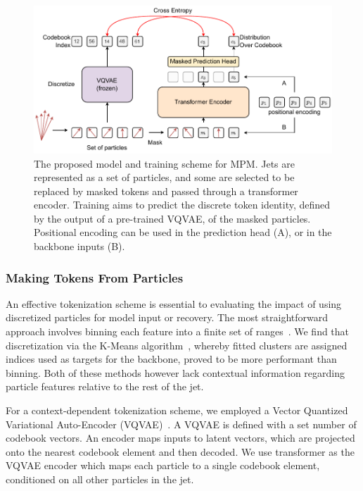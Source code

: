 \begin{figure}
    \centering
    \includegraphics[width=0.99\linewidth]{Figures/foundation_models/mpm1.pdf}
    \caption{
        The proposed model and training scheme for MPM.
        Jets are represented as a set of particles, and some are selected to be replaced by masked tokens and passed through a transformer encoder.
        Training aims to predict the discrete token identity, defined by the output of a pre-trained VQVAE, of the masked particles.
        Positional encoding can be used in the prediction head (A), or in the backbone inputs (B).
    }
    \label{fig:mpm1}
\end{figure}

\subsubsection{Making Tokens From Particles}
\label{subsec:vqvae}

An effective tokenization scheme is essential to evaluating the impact of using discretized particles for model input or recovery.
The most straightforward approach involves binning each feature into a finite set of ranges~\cite{JetGPT}.
We find that discretization via the K-Means algorithm~\cite{KMeans}, whereby fitted clusters are assigned indices used as targets for the backbone, proved to be more performant than binning.
Both of these methods however lack contextual information regarding particle features relative to the rest of the jet.

For a context-dependent tokenization scheme, we employed a Vector Quantized Variational Auto-Encoder (VQVAE)~\cite{VQVAE}.
A VQVAE is defined with a set number of codebook vectors.
An encoder maps inputs to latent vectors, which are projected onto the nearest codebook element and then decoded.
We use transformer as the VQVAE encoder which maps each particle to a single codebook element, conditioned on all other particles in the jet.

